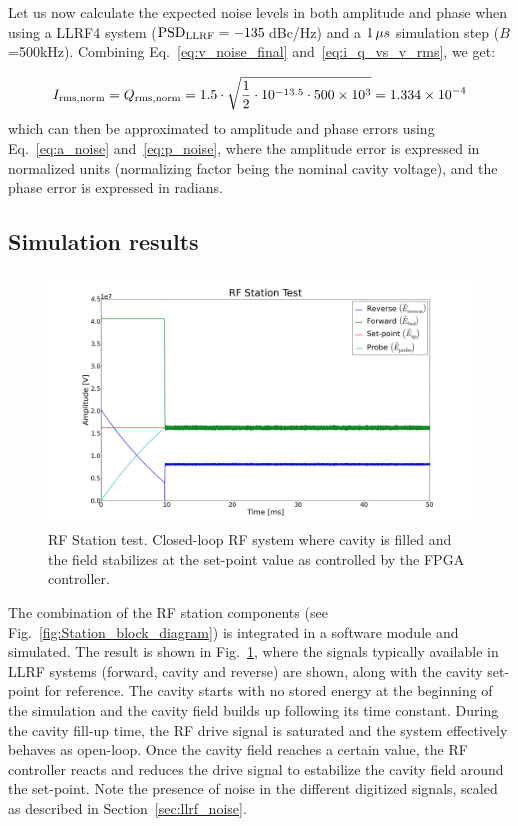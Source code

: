 \documentclass[a4paper,12pt]{article}
\begin{document}
Let us now calculate the expected noise levels in both amplitude and phase when using a LLRF4 system (${\rm PSD}_{\rm LLRF}=-135\thinspace$dBc/Hz) and a $1\thinspace\mu s$ simulation step ($B$=500\thinspace kHz). Combining Eq.~\eqref{eq:v_noise_final} and~\ref{eq:i_q_vs_v_rms}, we get:

\begin{equation}
   I_{\rm rms,norm} = Q_{\rm rms,norm} =  1.5 \cdot \sqrt{\frac{1}{2} \cdot 10^{-13.5} \cdot 500 \times 10^3}= 1.334\times 10^{-4}
\end{equation}
which can then be approximated to amplitude and phase errors using Eq.~\eqref{eq:a_noise} and~\eqref{eq:p_noise}, where the amplitude error is expressed in normalized units (normalizing factor being the nominal cavity voltage), and the phase error is expressed in radians.

\subsection{Simulation results}

\begin{figure}
\centering
\includegraphics[scale=0.25]{../figures/rf_station_test.png}
\caption{RF Station test. Closed-loop RF system where cavity is filled and the field stabilizes at the set-point value as controlled by the FPGA controller.}
\label{fig:rf_test_step}
\end{figure}

The combination of the RF station components (see Fig.~\ref{fig:Station_block_diagram}) is integrated in a software module and simulated. The result is shown in Fig.~\ref{fig:rf_test_step}, where the signals typically available in LLRF systems (forward, cavity and reverse) are shown, along with the cavity set-point for reference. The cavity starts with no stored energy at the beginning of the simulation and the cavity field builds up following its time constant. During the cavity fill-up time, the RF drive signal is saturated and the system effectively behaves as open-loop. Once the cavity field reaches a certain value, the RF controller reacts and reduces the drive signal to estabilize the cavity field around the set-point. Note the presence of noise in the different digitized signals, scaled as described in Section~\ref{sec:llrf_noise}.
\end{document}
